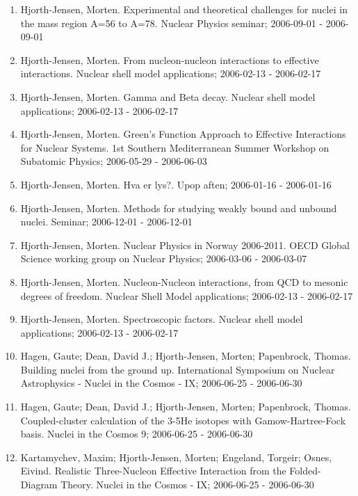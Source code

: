 \documentclass[%
oneside,                 %
final,                   %
10pt]{article}
\begin{document}
\begin{enumerate}
\item Hjorth-Jensen, Morten.  Experimental and theoretical challenges for nuclei in the mass region A=56 to A=78. Nuclear Physics seminar; 2006-09-01 - 2006-09-01

\item Hjorth-Jensen, Morten.  From nucleon-nucleon interactions to effective interactions. Nuclear shell model applications; 2006-02-13 - 2006-02-17

\item Hjorth-Jensen, Morten.  Gamma and Beta decay. Nuclear shell model applications; 2006-02-13 - 2006-02-17

\item Hjorth-Jensen, Morten.  Green's Function Approach to Effective Interactions for Nuclear Systems. 1st Southern Mediterranean Summer Workshop on Subatomic Physics; 2006-05-29 - 2006-06-03

\item Hjorth-Jensen, Morten.  Hva er lys?. Upop aften; 2006-01-16 - 2006-01-16

\item Hjorth-Jensen, Morten.  Methods for studying weakly bound and unbound nuclei. Seminar; 2006-12-01 - 2006-12-01

\item Hjorth-Jensen, Morten.  Nuclear Physics in Norway 2006-2011. OECD Global Science working group on Nuclear Physics; 2006-03-06 - 2006-03-07

\item Hjorth-Jensen, Morten.  Nucleon-Nucleon interactions, from QCD to mesonic degrees of freedom. Nuclear Shell Model applications; 2006-02-13 - 2006-02-17

\item Hjorth-Jensen, Morten.  Spectroscopic factors. Nuclear shell model applications; 2006-02-13 - 2006-02-17

\item Hagen, Gaute; Dean, David J.; Hjorth-Jensen, Morten; Papenbrock, Thomas.  Building nuclei from the ground up. International Symposium on Nuclear Astrophysics - Nuclei in the Cosmos - IX; 2006-06-25 - 2006-06-30

\item Hagen, Gaute; Dean, David J.; Hjorth-Jensen, Morten; Papenbrock, Thomas.  Coupled-cluster calculation of the 3-5He isotopes with Gamow-Hartree-Fock basis. Nuclei in the Cosmos 9; 2006-06-25 - 2006-06-30

\item Kartamychev, Maxim; Hjorth-Jensen, Morten; Engeland, Torgeir; Osnes, Eivind.  Realistic Three-Nucleon Effective Interaction from the Folded-Diagram Theory. Nuclei in the Cosmos - IX; 2006-06-25 - 2006-06-30


\end{enumerate}
\end{document}
